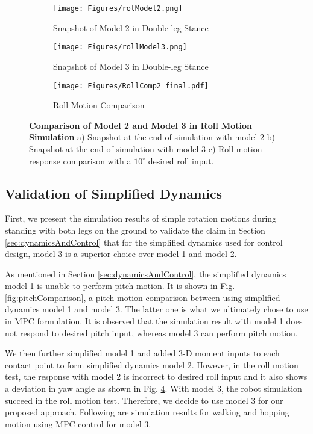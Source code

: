 	
\begin{figure}%
	\hspace{0.2cm}
     \center
     \begin{subfigure}[b]{0.13\textwidth}
         \centering
         \texttt{[image: Figures/rolModel2.png]}
         \caption{Snapshot of Model 2 in Double-leg Stance}
         \label{fig:rollModel2}
     \end{subfigure}
     \quad \quad
     \begin{subfigure}[b]{0.14\textwidth}
         \centering
         \texttt{[image: Figures/rollModel3.png]}
         \caption{Snapshot of Model 3 in Double-leg Stance}
         \label{fig:rollModel3}
     \end{subfigure}
     \begin{subfigure}[b]{0.5\textwidth}
         \centering
         \texttt{[image: Figures/RollComp2\_final.pdf]}
         \caption{Roll Motion Comparison}
         \label{fig:rollPlot}
     \end{subfigure}
        \caption{{\bfseries Comparison of Model 2 and Model 3 in Roll Motion Simulation}  a) Snapshot at the end of simulation with model 2  b) Snapshot at the end of simulation with model 3   c) Roll motion response comparison with a $10^{\circ}$ desired roll input.}
        \label{fig:rollComparison}
\end{figure}

\subsection{Validation of Simplified Dynamics}
First, we present the simulation results of simple rotation motions during standing with both legs on the ground to validate the claim in Section \ref{sec:dynamicsAndControl} that for the simplified dynamics used for control design, model 3 is a superior choice over model 1 and model 2. 

As mentioned in Section \ref{sec:dynamicsAndControl}, the simplified dynamics model 1 is unable to perform pitch motion. It is shown in Fig. \ref{fig:pitchComparison}, a pitch motion comparison between using simplified dynamics model 1 and model 3. The latter one is what we ultimately chose to use in MPC formulation. It is observed that the simulation result with model 1 does not respond to desired pitch input, whereas model 3 can perform pitch motion. 

We then further simplified model 1 and added 3-D moment inputs to each contact point to form simplified dynamics model 2. However, in the roll motion test, the response with model 2 is incorrect to desired roll input and it also shows a deviation in yaw angle as shown in Fig. \ref{fig:rollComparison}. With model 3, the robot simulation succeed in the roll motion test. 
Therefore, we decide to use model 3 for our proposed approach. Following are simulation results for walking and hopping motion using MPC control for model 3.

